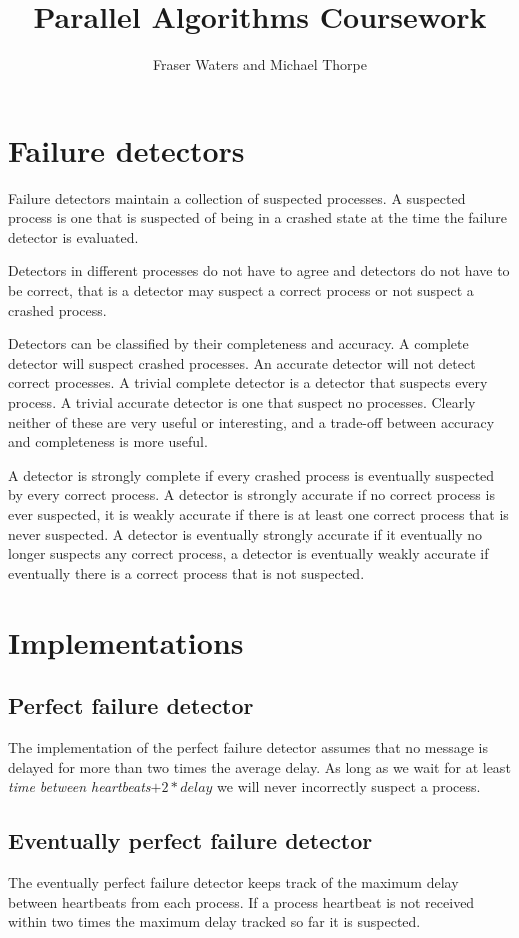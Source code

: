 \documentclass[11pt]{amsart}
\title{Parallel Algorithms Coursework}
\author{Fraser Waters and Michael Thorpe}
\begin{document}
\maketitle

\section{Failure detectors}

Failure detectors maintain a collection of suspected processes. A suspected
process is one that is suspected of being in a crashed state at the time the
failure detector is evaluated.

Detectors in different processes do not have to agree and detectors do not have
to be correct, that is a detector may suspect a correct process or not suspect
a crashed process.

Detectors can be classified by their completeness and accuracy. A complete
detector will suspect crashed processes.  An accurate detector will not detect
correct processes. A trivial complete detector is a detector that suspects
every process. A trivial accurate detector is one that suspect no processes.
Clearly neither of these are very useful or interesting, and a trade-off
between accuracy and completeness is more useful.

A detector is strongly complete if every crashed process is eventually
suspected by every correct process. A detector is strongly accurate if no
correct process is ever suspected, it is weakly accurate if there is at least
one correct process that is never suspected. A detector is eventually strongly
accurate if it eventually no longer suspects any correct process, a detector is
eventually weakly accurate if eventually there is a correct process that is not
suspected. 

\section{Implementations}

\subsection{Perfect failure detector}

The implementation of the perfect failure detector assumes that no message is
delayed for more than two times the average delay. As long as we wait for at
least \emph{time between heartbeats}$ + 2 * delay$ we will never incorrectly
suspect a process. 

\subsection{Eventually perfect failure detector}

The eventually perfect failure detector keeps track of the maximum delay
between heartbeats from each process. If a process heartbeat is not received
within two times the maximum delay tracked so far it is suspected.
\end{document}
